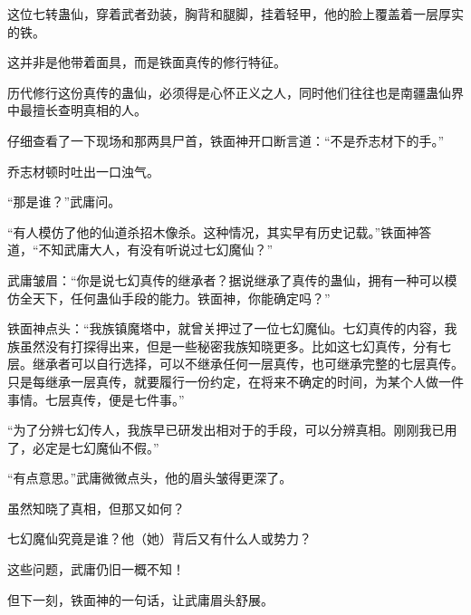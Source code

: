 \begin{this_body}
这位七转蛊仙，穿着武者劲装，胸背和腿脚，挂着轻甲，他的脸上覆盖着一层厚实的铁。

这并非是他带着面具，而是铁面真传的修行特征。

历代修行这份真传的蛊仙，必须得是心怀正义之人，同时他们往往也是南疆蛊仙界中最擅长查明真相的人。

仔细查看了一下现场和那两具尸首，铁面神开口断言道：“不是乔志材下的手。”

乔志材顿时吐出一口浊气。

“那是谁？”武庸问。

“有人模仿了他的仙道杀招木像杀。这种情况，其实早有历史记载。”铁面神答道，“不知武庸大人，有没有听说过七幻魔仙？”

武庸皱眉：“你是说七幻真传的继承者？据说继承了真传的蛊仙，拥有一种可以模仿全天下，任何蛊仙手段的能力。铁面神，你能确定吗？”

铁面神点头：“我族镇魔塔中，就曾关押过了一位七幻魔仙。七幻真传的内容，我族虽然没有打探得出来，但是一些秘密我族知晓更多。比如这七幻真传，分有七层。继承者可以自行选择，可以不继承任何一层真传，也可继承完整的七层真传。只是每继承一层真传，就要履行一份约定，在将来不确定的时间，为某个人做一件事情。七层真传，便是七件事。”

“为了分辨七幻传人，我族早已研发出相对于的手段，可以分辨真相。刚刚我已用了，必定是七幻魔仙不假。”

“有点意思。”武庸微微点头，他的眉头皱得更深了。

虽然知晓了真相，但那又如何？

七幻魔仙究竟是谁？他（她）背后又有什么人或势力？

这些问题，武庸仍旧一概不知！

但下一刻，铁面神的一句话，让武庸眉头舒展。

\end{this_body}

